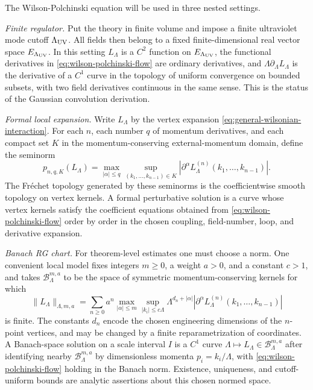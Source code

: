 \begin{definition}
The Wilson-Polchinski equation will be used in three nested settings.

\emph{Finite regulator.}  Put the theory in finite volume and impose a finite
ultraviolet mode cutoff \(\Lambda_{\rm UV}\).  All fields then belong to a
fixed finite-dimensional real vector space \(E_{\Lambda_{\rm UV}}\).  In this
setting \(L_\Lambda\) is a \(C^2\) function on
\(E_{\Lambda_{\rm UV}}\), the functional derivatives in
\eqref{eq:wilson-polchinski-flow} are ordinary derivatives, and
\(\Lambda\partial_\Lambda L_\Lambda\) is the derivative of a \(C^1\) curve in
the topology of uniform convergence on bounded subsets, with two field
derivatives continuous in the same sense.  This is the status of the Gaussian
convolution derivation.

\emph{Formal local expansion.}  Write \(L_\Lambda\) by the vertex expansion
\eqref{eq:general-wilsonian-interaction}.  For each \(n\), each number
\(q\) of momentum derivatives, and each compact set \(K\) in the
momentum-conserving external-momentum domain, define the seminorm
\[
  p_{n,q,K}(L_\Lambda)
  =
  \max_{|\alpha|\leq q}
  \sup_{(k_1,\ldots,k_{n-1})\in K}
  \left|
    \partial^\alpha L_\Lambda^{(n)}(k_1,\ldots,k_{n-1})
  \right|.
\]
The Fr\'echet topology generated by these seminorms is the coefficientwise
smooth topology on vertex kernels.  A formal perturbative solution is a curve
whose vertex kernels satisfy the coefficient equations obtained from
\eqref{eq:wilson-polchinski-flow} order by order in the chosen coupling,
field-number, loop, and derivative expansion.

\emph{Banach RG chart.}  For theorem-level estimates one must choose a norm.
One convenient local model fixes integers \(m\geq0\), a weight \(a>0\), and a
constant \(c>1\), and takes \(\mathcal B_{\Lambda}^{m,a}\) to be the space of
symmetric momentum-conserving kernels for which
\[
  \|L_\Lambda\|_{\Lambda,m,a}
  =
  \sum_{n\geq0} a^n
  \max_{|\alpha|\leq m}
  \sup_{|k_i|\leq c\Lambda}
  \Lambda^{d_n+|\alpha|}
  \left|
    \partial^\alpha L_\Lambda^{(n)}(k_1,\ldots,k_{n-1})
  \right|
\]
is finite.  The constants \(d_n\) encode the chosen engineering dimensions of
the \(n\)-point vertices, and may be changed by a finite reparametrization of
coordinates.  A Banach-space solution on a scale interval \(I\) is a
\(C^1\) curve \(\Lambda\mapsto L_\Lambda\in\mathcal B_{\Lambda}^{m,a}\)
after identifying nearby \(\mathcal B_{\Lambda}^{m,a}\) by dimensionless
momenta \(p_i=k_i/\Lambda\), with
\eqref{eq:wilson-polchinski-flow} holding in the Banach norm.  Existence,
uniqueness, and cutoff-uniform bounds are analytic assertions about this
chosen normed space.
\end{definition}

